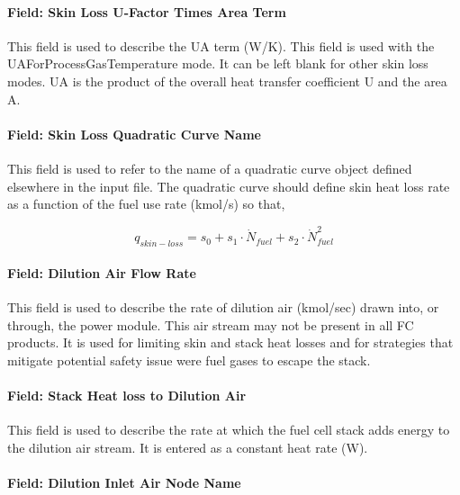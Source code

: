 \paragraph{Field: Skin Loss U-Factor Times Area Term}\label{field-skin-loss-u-factor-times-area-term}

This field is used to describe the UA term (W/K). This field is used with the UAForProcessGasTemperature mode. It can be left blank for other skin loss modes. UA is the product of the overall heat transfer coefficient U and the area A.

\paragraph{Field: Skin Loss Quadratic Curve Name}\label{field-skin-loss-quadratic-curve-name}

This field is used to refer to the name of a quadratic curve object defined elsewhere in the input file. The quadratic curve should define skin heat loss rate as a function of the fuel use rate (kmol/s) so that,

\begin{equation}
{q_{skin - loss}} = {s_0} + {s_1} \cdot {\dot N_{fuel}} + {s_2} \cdot \dot N_{fuel}^2
\end{equation}

\paragraph{Field: Dilution Air Flow Rate}\label{field-dilution-air-flow-rate}

This field is used to describe the rate of dilution air (kmol/sec) drawn into, or through, the power module. This air stream may not be present in all FC products. It is used for limiting skin and stack heat losses and for strategies that mitigate potential safety issue were fuel gases to escape the stack.

\paragraph{Field: Stack Heat loss to Dilution Air}\label{field-stack-heat-loss-to-dilution-air}

This field is used to describe the rate at which the fuel cell stack adds energy to the dilution air stream. It is entered as a constant heat rate (W).

\paragraph{Field: Dilution Inlet Air Node Name}\label{field-dilution-inlet-air-node-name}

